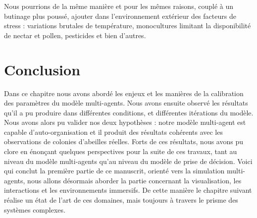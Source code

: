 	Nous pourrions de la même manière et pour les mêmes raisons, couplé à un butinage plus poussé, ajouter dans l'environnement extérieur des facteurs de stress : variations brutales de température, monocultures limitant la disponibilité de nectar et pollen, pesticides et bien d'autres.
	
	
			
	\section*{Conclusion}
	Dans ce chapitre nous avons abordé les enjeux et les manières de la calibration des paramètres du modèle multi-agents. Nous avons ensuite observé les résultats qu'il a pu produire dans différentes conditions, et différentes itérations du modèle. Nous avons alors pu valider nos deux hypothèses : notre modèle multi-agent est capable d'auto-organisation et il produit des résultats cohérents avec les observations de colonies d'abeilles réelles. Forts de ces résultats, nous avons pu clore en énonçant quelques perspectives pour la suite de ces travaux, tant au niveau du modèle multi-agents qu'au niveau du modèle de prise de décision. Voici qui conclut la première partie de ce manuscrit, orienté vers la simulation multi-agents, nous allons désormais aborder la partie concernant la visualisation, les interactions et les environnements immersifs. De cette manière le chapitre suivant réalise un état de l'art de ces domaines, mais toujours à travers le prisme des systèmes complexes.